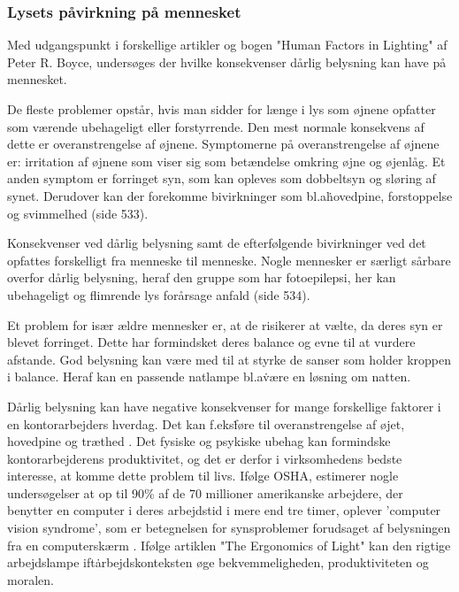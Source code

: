 \subsubsection{Lysets påvirkning på mennesket} 
\label{sec:konsekvenser}

Med udgangspunkt i forskellige artikler og bogen "Human Factors in Lighting" af Peter R. Boyce, undersøges der hvilke konsekvenser dårlig belysning kan have på mennesket. 

De fleste problemer opstår, hvis man sidder for længe i lys som øjnene opfatter som værende ubehageligt eller forstyrrende. Den mest normale konsekvens af dette er overanstrengelse af øjnene. Symptomerne på overanstrengelse af øjnene er: irritation af øjnene som viser sig som betændelse omkring øjne og øjenlåg. Et anden symptom er forringet syn, som kan opleves som dobbeltsyn og sløring af synet. Derudover kan der forekomme bivirkninger som bl.a\. hovedpine, forstoppelse og svimmelhed \cite{human_factors}(side 533).

Konsekvenser ved dårlig belysning samt de efterfølgende bivirkninger ved det opfattes forskelligt fra menneske til menneske. Nogle mennesker er særligt sårbare overfor dårlig belysning, heraf den gruppe som har fotoepilepsi, her kan ubehageligt og flimrende lys forårsage anfald \cite{human_factors}(side 534). 

Et problem for især ældre mennesker er, at de risikerer at vælte, da deres syn er blevet forringet. Dette har formindsket deres balance og evne til at vurdere afstande. God belysning kan være med til at styrke de sanser som holder kroppen i balance. Heraf kan en passende natlampe bl.a\. være en løsning om natten\cite{human_factors}. 

Dårlig belysning kan have negative konsekvenser for mange forskellige faktorer i en kontorarbejders hverdag. Det kan f.eks\. føre til overanstrengelse af øjet, hovedpine og træthed \cite{ergonomi_arbejdsplads}. Det fysiske og psykiske ubehag kan formindske kontorarbejderens produktivitet, og det er derfor i virksomhedens bedste interesse, at komme dette problem til livs. Ifølge OSHA, estimerer nogle undersøgelser at op til 90\% af de 70 millioner amerikanske arbejdere, der benytter en computer i deres arbejdstid i mere end tre timer, oplever 'computer vision syndrome', som er betegnelsen for synsproblemer forudsaget af belysningen fra en computerskærm \cite{CVS}. Ifølge artiklen "The Ergonomics of Light" kan den rigtige arbejdslampe ift\. arbejdskonteksten øge bekvemmeligheden, produktiviteten og moralen\cite{ergonomi_arbejdsplads}. 